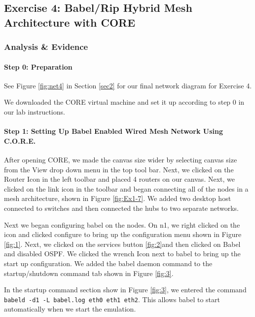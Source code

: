 \documentclass[main.tex]{subfiles}
\begin{document}
\subsection{Exercise 4: Babel/Rip Hybrid Mesh Architecture with CORE }
\subsubsection{Analysis \& Evidence }
\paragraph{Step 0: Preparation}
\hfill \break
See Figure \ref{fig:net4} in Section \ref{sec2} for our final network diagram for Exercise 4.

\noindent We downloaded the CORE virtual machine and set it up according to step 0 in our lab instructions.

\paragraph{Step 1: Setting Up Babel Enabled Wired Mesh Network Using C.O.R.E. }
\hfill \break

\noindent After opening CORE, we made the canvas size wider by selecting canvas size from the View drop down menu in the top tool bar.  Next, we clicked on the Router Icon in the left toolbar and placed 4 routers on our canvas.
\noindent Next, we clicked on the link icon in the toolbar and began connecting all of the nodes in a mesh architecture, shown in Figure \ref{fig:Ex1-7}.
\noindent We added two desktop host connected to switches and then connected the hubs to two separate networks.

\noindent Next we began configuring babel on the nodes.  On n1, we right clicked on the icon and clicked configure to bring up the configuration menu shown in Figure \ref{fig:1}.  
\noindent Next, we clicked on the services button \ref{fig:2}and then clicked on Babel and disabled OSPF.  We clicked the wrench Icon next to babel to bring up the start up configuration.
We added the babel daemon command to the startup/shutdown command tab shown in Figure \ref{fig:3}. 



\noindent In the startup command section show in Figure \ref{fig:3}, we entered the command \texttt{babeld -d1 -L babel.log eth0 eth1 eth2}.  This allows babel to start
automatically when we start the emulation.
\end{document}
